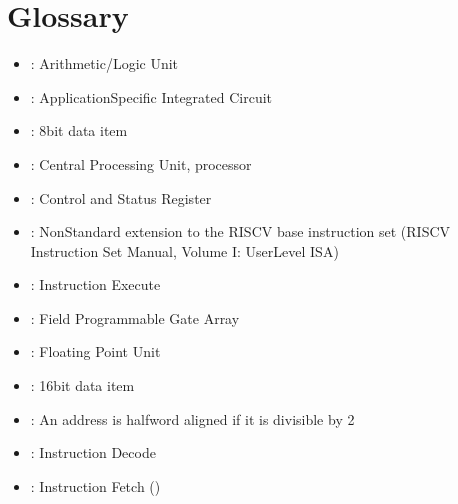 \documentclass[letterpaper,10pt,english]{sphinxmanual}
\begin{document}
\chapter{Glossary}
\label{\detokenize{glossary:glossary}}\label{\detokenize{glossary:id1}}\label{\detokenize{glossary::doc}}\begin{itemize}
\item {} 
\sphinxAtStartPar
{}: Arithmetic/Logic Unit

\item {} 
\sphinxAtStartPar
{}: Application\sphinxhyphen{}Specific Integrated Circuit

\item {} 
\sphinxAtStartPar
{}: 8\sphinxhyphen{}bit data item

\item {} 
\sphinxAtStartPar
{}: Central Processing Unit, processor

\item {} 
\sphinxAtStartPar
{}: Control and Status Register

\item {} 
\sphinxAtStartPar
{}: Non\sphinxhyphen{}Standard extension to the RISC\sphinxhyphen{}V base instruction set (RISC\sphinxhyphen{}V Instruction Set Manual, Volume I: User\sphinxhyphen{}Level ISA)

\item {} 
\sphinxAtStartPar
{}: Instruction Execute

\item {} 
\sphinxAtStartPar
{}: Field Programmable Gate Array

\item {} 
\sphinxAtStartPar
{}: Floating Point Unit

\item {} 
\sphinxAtStartPar
{}: 16\sphinxhyphen{}bit data item

\item {} 
\sphinxAtStartPar
{}: An address is halfword aligned if it is divisible by 2

\item {} 
\sphinxAtStartPar
{}: Instruction Decode

\item {} 
\sphinxAtStartPar
{}: Instruction Fetch ({\hyperref[\detokenize{instruction_fetch:instruction-fetch}]{}})


\end{itemize}
\end{document}
